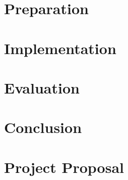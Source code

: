 \documentclass[12pt,a4paper,twoside,openany]{report}
\begin{document}
    \chapter{Preparation}\label{ch:preparation}
    


    \chapter{Implementation}\label{ch:implementation}
    


    \chapter{Evaluation}\label{ch:evaluation}
    


    \chapter{Conclusion}\label{ch:conclusion}
    

    


    \printbibliography[heading=bibintoc]

    \appendix


    \chapter{Project Proposal}\label{ch:proposal}
    
\end{document}
